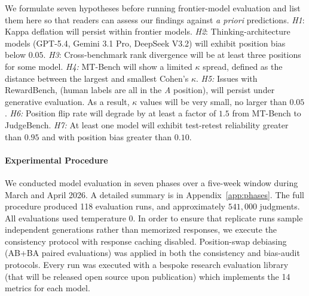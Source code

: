 \documentclass[11pt]{article}
\begin{document}
We formulate seven hypotheses before running frontier-model evaluation and list them here so that readers can assess our findings against \textit{a priori} predictions. \textit{H1}: Kappa deflation will persist within frontier models. \textit{H2}: Thinking-architecture models (GPT-5.4, Gemini 3.1 Pro, DeepSeek V3.2) will exhibit position bias below $0.05$. \textit{H3}: Cross-benchmark rank divergence will be at least three positions for some model. \textit{H4:} MT-Bench will show a limited $\kappa$ spread, defined as the distance between the largest and smallest Cohen's $\kappa$. \textit{H5:} Issues with RewardBench, (human labels are all in the \textit{A} position), will persist under generative evaluation. As a result, $\kappa$ values will be very small, no larger than $0.05$. \textit{H6:} Position flip rate will degrade by at least a factor of $1.5$ from MT-Bench to JudgeBench. \textit{H7:} At least one model will exhibit test-retest reliability greater than $0.95$ and with position bias greater than $0.10$. 

\paragraph{Experimental Procedure}


We conducted model evaluation in seven phases over a five-week window during March and April 2026. A detailed summary is in Appendix~\ref{app:phases}. The full procedure produced 118 evaluation runs, and approximately $541,000$ judgments. All evaluations used temperature $0$. In order to ensure that replicate runs sample independent generations rather than memorized responses, we execute the consistency protocol with response caching disabled. Position-swap debiasing (AB+BA paired evaluations) was applied in both the consistency and bias-audit protocols. Every run was executed with a bespoke research evaluation library (that will be released open source upon publication) which implements the 14 metrics for each model.
\end{document}
